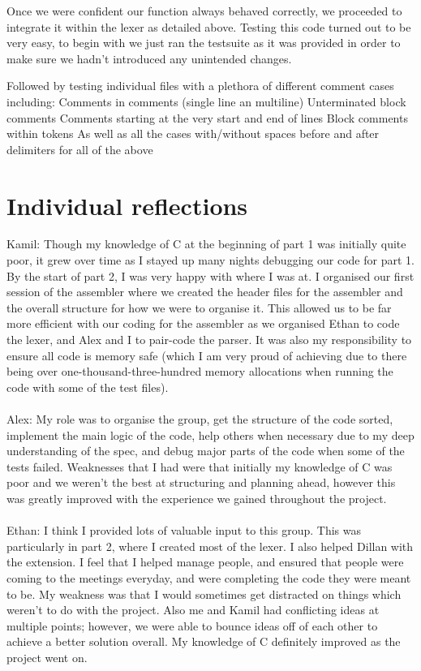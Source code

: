 \documentclass[11pt]{article}
\begin{document}
Once we were confident our function always behaved correctly, we proceeded to integrate it within the lexer as detailed above. Testing this code turned out to be very easy, to begin with we just ran the testsuite as it was provided in order to make sure we hadn’t introduced any unintended changes.  

Followed by testing individual files with a plethora of different comment cases including:
Comments in comments (single line an multiline)
Unterminated block comments
Comments starting at the very start and end of lines
Block comments within tokens
As well as all the cases with/without spaces before and after delimiters for all of the above


\section{Individual reflections} 
Kamil:
Though my knowledge of C at the beginning of part 1 was initially quite poor, it grew over time as I stayed up many nights debugging our code for part 1. By the start of part 2, I was very happy with where I was at. I organised our first session of the assembler where we created the header files for the assembler and the overall structure for how we were to organise it. This allowed us to be far more efficient with our coding for the assembler as we organised Ethan to code the lexer, and Alex and I to pair-code the parser. It was also my responsibility to ensure all code is memory safe (which I am very proud of achieving due to there being over one-thousand-three-hundred memory allocations when running the code with some of the test files).
\\
\\
Alex:
My role was to organise the group, get the structure of the code sorted, implement the main logic of the code, help others when necessary due to my deep understanding of the spec, and debug major parts of the code when some of the tests failed. Weaknesses that I had were that initially my knowledge of C was poor and we weren’t the best at structuring and planning ahead, however this was greatly improved with the experience we gained throughout the project.
\\
\\
Ethan:
I think I provided lots of valuable input to this group. This was particularly in part 2, where I created most of the lexer. I also helped Dillan with the extension. I feel that I helped manage people, and ensured that people were coming to the meetings everyday, and were completing the code they were meant to be. My weakness was that I would sometimes get distracted on things which weren’t to do with the project. Also me and Kamil had conflicting ideas at multiple points; however, we were able to bounce ideas off of each other to achieve a better solution overall. My knowledge of C definitely improved as the project went on.
\end{document}
